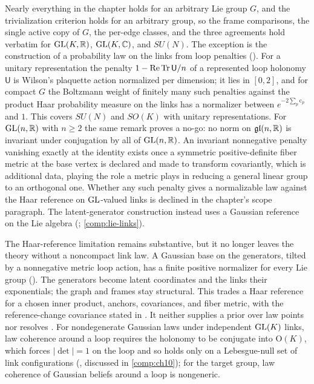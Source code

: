Nearly everything in the chapter holds for an arbitrary Lie group $G$, and the trivialization criterion
holds for an arbitrary group, so the frame comparisons, the single active copy of $G$, the per-edge classes,
and the three agreements hold verbatim for $\mathrm{GL}(K,\mathbb R)$, $\mathrm{GL}(K,\mathbb C)$, and $SU(N)$. The exception is
the construction of a probability law on the links from loop penalties (). For a
unitary representation the penalty $1-\operatorname{Re}\operatorname{Tr}\mathsf U/n$ of a represented loop holonomy
$\mathsf U$ is Wilson's plaquette action \citep{WilsonConfinement1974} normalized per dimension; it lies in
$[0,2]$, and for compact $G$ the Boltzmann weight of finitely many such penalties against the product Haar
probability measure on the links has a normalizer between $e^{-2\sum_p\mathrm c_p}$ and $1$. This covers
$SU(N)$ and $SO(K)$ with unitary representations. For $\mathrm{GL}(n,\mathbb R)$ with $n\geq2$ the same remark proves a
no-go: no norm on $\mathfrak{gl}(n,\mathbb R)$ is invariant under conjugation by all of $\mathrm{GL}(n,\mathbb R)$. An invariant
nonnegative penalty vanishing exactly at the identity exists once a symmetric positive-definite fiber metric
at the base vertex is declared and made to transform covariantly, which is additional data, playing the role
a metric plays in reducing a general linear group to an orthogonal one. Whether any such penalty gives a
normalizable law against the Haar reference on $\mathrm{GL}$-valued links is declined in the chapter's scope
paragraph. The latent-generator construction instead uses a Gaussian reference on the Lie algebra
(; \cref{comp:lie-links}).

The Haar-reference limitation remains substantive, but it no longer leaves the theory without a
noncompact link law. A Gaussian base on the generators, tilted by a nonnegative metric loop action,
has a finite positive normalizer for every Lie group (). The
generators become latent coordinates and the links their exponentials; the graph and frames stay
structural. This trades a Haar reference for a chosen inner product, anchors, covariances, and fiber
metric, with the reference-change covariance stated in . It neither
supplies a prior over law points nor resolves . For nondegenerate
Gaussian laws under independent $\mathrm{GL}(K)$ links, law coherence
around a loop requires the holonomy to be conjugate into $\mathrm O(K)$, which forces $\lvert\det\rvert=1$ on
the loop and so holds only on a Lebesgue-null set of link configurations
(, discussed in \cref{comp:ch10}); for the target group, law coherence of
Gaussian beliefs around a loop is nongeneric.

